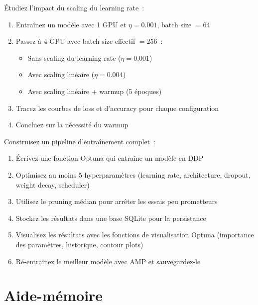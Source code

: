 \begin{exercice}
\'Etudiez l'impact du scaling du learning rate~:
\begin{enumerate}
  \item Entra\^inez un mod\`ele avec 1 GPU et $\eta = 0.001$, batch
    size $= 64$
  \item Passez \`a 4 GPU avec batch size effectif $= 256$~:
    \begin{itemize}
      \item Sans scaling du learning rate ($\eta = 0.001$)
      \item Avec scaling lin\'eaire ($\eta = 0.004$)
      \item Avec scaling lin\'eaire + warmup (5 \'epoques)
    \end{itemize}
  \item Tracez les courbes de loss et d'accuracy pour chaque configuration
  \item Concluez sur la n\'ecessit\'e du warmup
\end{enumerate}
\end{exercice}

\begin{exercice}
Construisez un pipeline d'entra\^inement complet~:
\begin{enumerate}
  \item \'Ecrivez une fonction  Optuna qui entra\^ine un
    mod\`ele en DDP
  \item Optimisez au moins 5 hyperparam\`etres (learning rate, architecture,
    dropout, weight decay, scheduler)
  \item Utilisez le pruning m\'edian pour arr\^eter les essais peu
    prometteurs
  \item Stockez les r\'esultats dans une base SQLite pour la persistance
  \item Visualisez les r\'esultats avec les fonctions de visualisation
    Optuna (importance des param\`etres, historique, contour plots)
  \item R\'e-entra\^inez le meilleur mod\`ele avec AMP et sauvegardez-le
\end{enumerate}
\end{exercice}

\section{Aide-m\'emoire}


